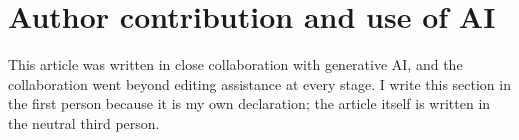 %

\section*{Author contribution and use of AI}

This article was written in close collaboration with generative AI, and the collaboration
went beyond editing assistance at every stage. I write this section in the first person
because it is my own declaration; the article itself is written in the neutral third person.


